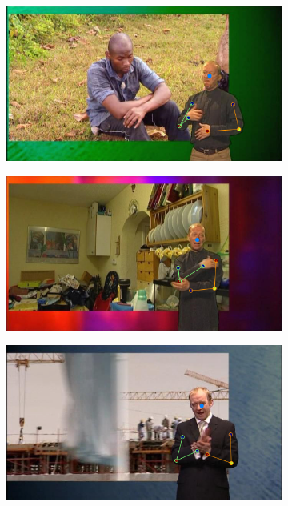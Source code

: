 \begin{figure}[t!]
    \centering
    \begin{subfigure}[b]{0.115\textwidth}
            \includegraphics[width=\textwidth]{resources/MotivativeAnnotation/BBCPose/bad_anno-1}
    \end{subfigure}
    \hfill
    \begin{subfigure}[b]{0.115\textwidth}
            \includegraphics[width=\textwidth]{resources/MotivativeAnnotation/BBCPose/bad_anno-2}
    \end{subfigure}
  	\hfill
    \begin{subfigure}[b]{0.115\textwidth}
            \includegraphics[width=\textwidth]{resources/MotivativeAnnotation/BBCPose/bad_anno-3}

\end{subfigure}
\end{figure}
